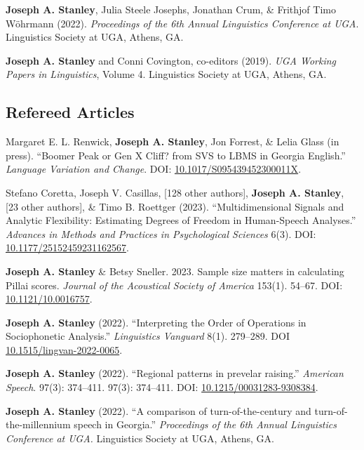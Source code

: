 \documentclass[
]{article}
\begin{document}
\textbf{Joseph A. Stanley}, Julia Steele Josephs, Jonathan Crum, \&
Frithjof Timo Wöhrmann (2022). \emph{Proceedings of the 6th Annual
Linguistics Conference at UGA}. Linguistics Society at UGA, Athens, GA.

\textbf{Joseph A. Stanley} and Conni Covington, co-editors (2019).
\emph{UGA Working Papers in Linguistics}, Volume 4. Linguistics Society
at UGA, Athens, GA.

\hypertarget{refereed-articles}{%
\subsection{Refereed Articles}\label{refereed-articles}}

Margaret E. L. Renwick, \textbf{Joseph A. Stanley}, Jon Forrest, \&
Lelia Glass (in press). ``Boomer Peak or Gen X Cliff? from SVS to LBMS
in Georgia English.'' \emph{Language Variation and Change}. DOI:
\href{https://doi.org/10.1017/S095439452300011X}{10.1017/S095439452300011X}.

Stefano Coretta, Joseph V. Casillas, {[}128 other authors{]},
\textbf{Joseph A. Stanley}, {[}23 other authors{]}, \& Timo B. Roettger
(2023). ``Multidimensional Signals and Analytic Flexibility: Estimating
Degrees of Freedom in Human-Speech Analyses.'' \emph{Advances in Methods
and Practices in Psychological Sciences} 6(3). DOI:
\href{https://doi.org/10.1177/25152459231162567}{10.1177/25152459231162567}.

\textbf{Joseph A. Stanley} \& Betsy Sneller. 2023. Sample size matters
in calculating Pillai scores. \emph{Journal of the Acoustical Society of
America} 153(1). 54--67. DOI:
\href{https://asa.scitation.org/doi/pdf/10.1121/10.0016757}{10.1121/10.0016757}.

\textbf{Joseph A. Stanley} (2022). ``Interpreting the Order of
Operations in Sociophonetic Analysis.'' \emph{Linguistics Vanguard}
8(1). 279--289. DOI
\href{https://doi.org/10.1515/lingvan-2022-0065}{10.1515/lingvan-2022-0065}.

\textbf{Joseph A. Stanley} (2022). ``Regional patterns in prevelar
raising.'' \emph{American Speech}. 97(3): 374--411. 97(3): 374--411.
DOI:
\href{http://doi.org/10.1215/00031283-9308384}{10.1215/00031283-9308384}.

\textbf{Joseph A. Stanley} (2022). ``A comparison of turn-of-the-century
and turn-of-the-millennium speech in Georgia.'' \emph{Proceedings of the
6th Annual Linguistics Conference at UGA.} Linguistics Society at UGA,
Athens, GA.
\end{document}
